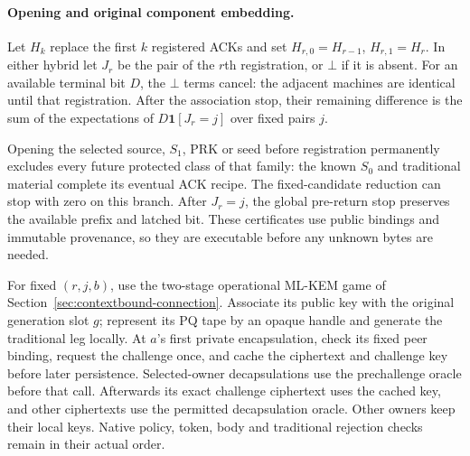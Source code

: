 \paragraph{Opening and original component embedding.}
Let $H_k$ replace the first $k$ registered ACKs and set
$H_{r,0}=H_{r-1}$, $H_{r,1}=H_r$. In either hybrid let $J_r$ be
the pair of the $r$th registration, or $\bot$ if it is absent. For
an available terminal bit $D$, the $\bot$ terms cancel: the adjacent
machines are identical until that registration. After the association
stop, their remaining difference is the sum of the expectations of
$D\mathbf1[J_r=j]$ over fixed pairs $j$.

Opening the selected source, $S_1$, PRK or seed before registration
permanently excludes every future protected class of that family: the
known $S_0$ and traditional material complete its eventual ACK recipe.
The fixed-candidate reduction can stop with zero on this branch.
After $J_r=j$, the global pre-return stop preserves the available prefix
and latched bit. These certificates use public bindings and immutable
provenance, so they are executable before any unknown bytes are needed.

For fixed $(r,j,b)$, use the two-stage operational ML-KEM game of
Section~\ref{sec:contextbound-connection}. Associate its public key with
the original generation slot $g$; represent its PQ tape by an opaque handle
and generate the traditional leg locally. At $a$'s first private
encapsulation, check its fixed peer binding, request the challenge once,
and cache the ciphertext and challenge key before later persistence.
Selected-owner decapsulations use the prechallenge oracle before that
call. Afterwards its exact challenge ciphertext uses the cached key,
and other ciphertexts use the permitted decapsulation oracle. Other
owners keep their local keys. Native policy, token, body and traditional
rejection checks remain in their actual order.

